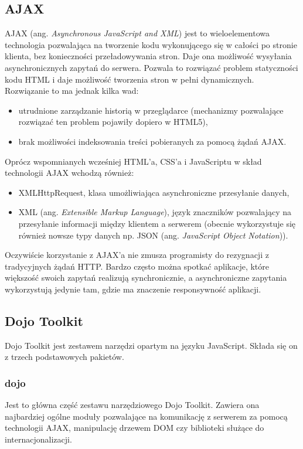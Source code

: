 \subsection[AJAX][AJAX]{AJAX}
\label{AJAX}
AJAX (ang. \textit{Asynchronous JavaScript and XML}) jest to wieloelementowa technologia pozwalająca na tworzenie kodu wykonującego się w całości po stronie klienta, bez konieczności przeładowywania stron. Daje ona możliwość wysyłania asynchronicznych zapytań do serwera. Pozwala to rozwiązać problem statyczności kodu HTML i daje możliwość tworzenia stron w pełni dynamicznych. Rozwiązanie to ma jednak kilka wad:
\begin{itemize}
	\item utrudnione zarządzanie historią w przeglądarce (mechanizmy pozwalające rozwiązać ten problem pojawiły dopiero w HTML5),
	\item brak możliwości indeksowania treści pobieranych za pomocą żądań AJAX. 
\end{itemize}
Oprócz wspomnianych wcześniej HTML'a, CSS'a i JavaScriptu w skład technologii AJAX wchodzą również:
\begin{itemize}
	\item XMLHttpRequest, klasa umożliwiająca asynchroniczne przesyłanie danych,
	\item XML (ang. \textit{Extensible Markup Language}), język znaczników pozwalający na przesyłanie informacji między klientem a serwerem (obecnie wykorzystuje się również nowsze typy danych np. JSON (ang. \textit{JavaScript Object Notation})).
\end{itemize}
Oczywiście korzystanie z AJAX'a nie zmusza programisty do rezygnacji z tradycyjnych żądań HTTP. Bardzo często można spotkać aplikacje, które większość swoich zapytań realizują synchronicznie, a asynchroniczne zapytania wykorzystują jedynie tam, gdzie ma znaczenie responsywność aplikacji.

\subsection[Dojo Toolkit][Dojo Toolkit]{Dojo Toolkit}
Dojo Toolkit jest zestawem narzędzi opartym na języku JavaScript. Składa się on z trzech podstawowych pakietów.

\subsubsection[dojo][dojo]{dojo}
Jest to główna część zestawu narzędziowego Dojo Toolkit. Zawiera ona najbardziej ogólne moduły pozwalające na komunikację z serwerem za pomocą technologii AJAX, manipulację drzewem DOM czy biblioteki służące do internacjonalizacji.

